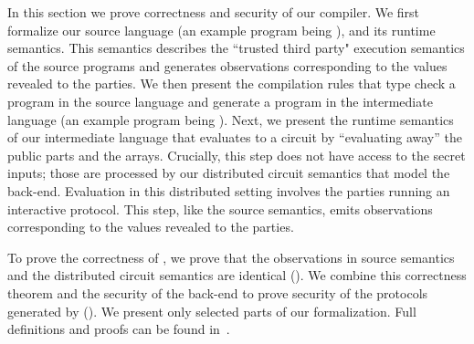 In this section we prove correctness and security of our \tool compiler.
We first formalize our source language (an example program being
), and its runtime semantics.
This semantics describes the ``trusted third party"
execution semantics of the source programs and
generates observations corresponding to the values revealed to the
parties.
%
We then present the compilation rules that type check a program in the
source language and generate a program in the intermediate
language (an example program being ).
%
Next, we present the runtime semantics of our intermediate language
that evaluates to a circuit by ``evaluating away'' the public parts
and the arrays. Crucially, this step does not have access to the secret
inputs; those are processed by our distributed circuit semantics that
model the \mpc back-end.
%
Evaluation in this distributed setting involves the parties running an
interactive protocol. This step, like  the source semantics, emits
observations corresponding to the values revealed to the parties.

To prove the correctness of \tool, we prove that  the observations in
source semantics and the distributed circuit semantics are identical
().
We combine this correctness theorem and the security of the \mpc
back-end to prove security of the protocols generated by \tool
().
We present only selected parts of our formalization. Full definitions
and proofs can be found in~\cite{anonymized}.



